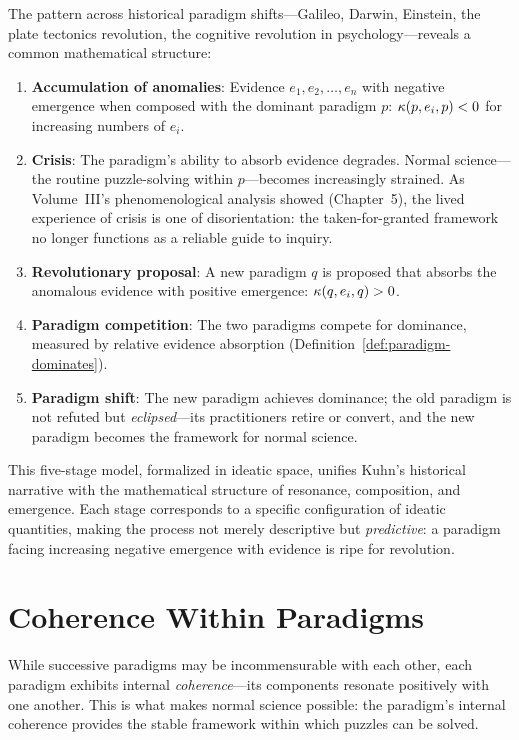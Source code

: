 \begin{remark}
The pattern across historical paradigm shifts---Galileo, Darwin, Einstein, the
plate tectonics revolution, the cognitive revolution in psychology---reveals a
common mathematical structure:

\begin{enumerate}
\item \textbf{Accumulation of anomalies}: Evidence $e_1, e_2, \ldots, e_n$
  with negative emergence when composed with the dominant paradigm $p$:
  $\kappa(p, e_i, p) < 0$ for increasing numbers of $e_i$.
\item \textbf{Crisis}: The paradigm's ability to absorb evidence degrades.
  Normal science---the routine puzzle-solving within $p$---becomes increasingly
  strained. As Volume~III's phenomenological analysis showed (Chapter~5),
  the lived experience of crisis is one of disorientation: the taken-for-granted
  framework no longer functions as a reliable guide to inquiry.
\item \textbf{Revolutionary proposal}: A new paradigm $q$ is proposed that
  absorbs the anomalous evidence with positive emergence: $\kappa(q, e_i, q) > 0$.
\item \textbf{Paradigm competition}: The two paradigms compete for dominance,
  measured by relative evidence absorption (Definition~\ref{def:paradigm-dominates}).
\item \textbf{Paradigm shift}: The new paradigm achieves dominance; the old
  paradigm is not refuted but \emph{eclipsed}---its practitioners retire or
  convert, and the new paradigm becomes the framework for normal science.
\end{enumerate}

This five-stage model, formalized in ideatic space, unifies Kuhn's historical
narrative with the mathematical structure of resonance, composition, and emergence.
Each stage corresponds to a specific configuration of ideatic quantities, making
the process not merely descriptive but \emph{predictive}: a paradigm facing
increasing negative emergence with evidence is ripe for revolution.
\end{remark}

\section{Coherence Within Paradigms}

While successive paradigms may be incommensurable with each other, each paradigm
exhibits internal \emph{coherence}---its components resonate positively with
one another. This is what makes normal science possible: the paradigm's internal
coherence provides the stable framework within which puzzles can be solved.

